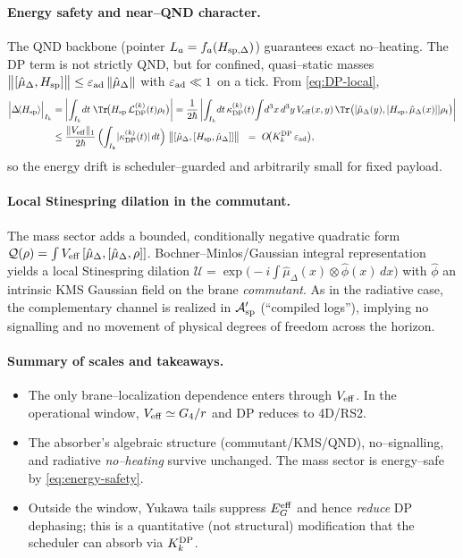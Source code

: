 \documentclass[10pt]{article}
\theoremstyle{definition}
\theoremstyle{plain}
\begin{document}
\paragraph{Energy safety and near--QND character.}\label{par:uom-main-228}
The QND backbone (pointer \(L_a=f_a(H_{\rm sp,\Delta})\)) guarantees exact no–heating. The DP term is not strictly QND, but for confined, quasi–static masses
\(
\big\|[\hat\mu_\Delta,H_{\rm sp}]\big\|\le \varepsilon_{\rm ad}\,\|\hat\mu_\Delta\|
\)
with \(\varepsilon_{\rm ad}\ll1\) on a tick. From \eqref{eq:DP-local},
\begin{align}
\Big|\Delta\!\langle H_{\rm sp}\rangle\Big|_{I_k}
&=\left|\int_{I_k}\!dt\;\Tr\!\big(H_{\rm sp}\,\mathcal L_{\rm DP}^{(k)}(t)\rho_t\big)\right|
=\frac{1}{2\hbar}\left|\int_{I_k}\!dt\,\kappa_{\rm DP}^{(k)}(t)\!\int\! d^3x\,d^3y\,V_{\rm eff}(x,y)\,
\Tr\big([\hat\mu_\Delta(y),[H_{\rm sp},\hat\mu_\Delta(x)]]\rho_t\big)\right|\notag\\
&\le \frac{\|V_{\rm eff}\|_{1}}{2\hbar}\,\Big(\!\int_{I_k}\!|\kappa_{\rm DP}^{(k)}(t)|\,dt\Big)\;
\big\|[\hat\mu_\Delta,[H_{\rm sp},\hat\mu_\Delta]]\big\|\ \ =\ O\!\big(K_k^{\rm DP}\,\varepsilon_{\rm ad}\big),
\label{eq:energy-safety}
\end{align}
so the energy drift is scheduler--guarded and arbitrarily small for fixed payload.

\paragraph{Local Stinespring dilation in the commutant.}\label{par:uom-main-229}
The mass sector adds a bounded, conditionally negative quadratic form \(\mathcal Q(\rho)=\int V_{\rm eff}\,[\hat\mu_\Delta,[\hat\mu_\Delta,\rho]]\). Bochner–Minlos/Gaussian integral representation yields a local Stinespring dilation \(\mathcal U=\exp\!\big(-i\!\int \hat\mu_\Delta(x)\otimes \hat\phi(x)\,dx\big)\) with \(\hat\phi\) an intrinsic KMS Gaussian field on the brane \emph{commutant}. As in the radiative case, the complementary channel is realized in \(\mathcal A_{\rm sp}'\) (``compiled logs''), implying no signalling and no movement of physical degrees of freedom across the horizon.

\paragraph{Summary of scales and takeaways.}\label{par:uom-main-230}
\begin{itemize}[leftmargin=1.25em]
\item The only brane--localization dependence enters through \(V_{\rm eff}\). In the operational window, \(V_{\rm eff}\simeq G_4/r\) and DP reduces to 4D/RS2.
\item The absorber’s algebraic structure (commutant/KMS/QND), no–signalling, and radiative \emph{no–heating} survive unchanged. The mass sector is energy--safe by \eqref{eq:energy-safety}.
\item Outside the window, Yukawa tails suppress \(E_G^{\rm eff}\) and hence \emph{reduce} DP dephasing; this is a quantitative (not structural) modification that the scheduler can absorb via \(K_k^{\rm DP}\).
\end{itemize}
\end{document}
